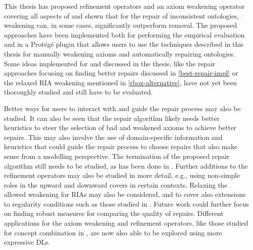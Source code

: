 
This thesis has proposed refinement operators and an axiom weakening operator covering all aspects of \SROIQ and shown that for the repair of inconsistent ontologies, weakening can, in some cases, significantly outperform removal. The proposed approaches have been implemented both for performing the empirical evaluation and in a Protégé plugin that allows users to use the techniques described in this thesis for manually weakening axioms and automatically repairing ontologies. Some ideas implemented for and discussed in the thesis, like the repair approaches focusing on finding better repairs discussed in \cref{best-repair-impl} or the relaxed RIA weakening mentioned in \cref{rbox-alternative}, have not yet been thoroughly studied and still have to be evaluated.

Better ways for users to interact with and guide the repair process may also be studied. It can also be seen that the repair algorithm likely needs better heuristics to steer the selection of bad and weakened axioms to achieve better repairs. This may also involve the use of domain-specific information and heuristics that could guide the repair process to choose repairs that also make sense from a modelling perspective. The termination of the proposed repair algorithm still needs to be studied, as has been done in \cite{confalonieri2020towards}. Further additions to the refinement operators may also be studied in more detail, e.g., using non-simple roles in the upward and downward covers in certain contexts. Relaxing the allowed weakening for RIAs may also be considered, and to cover also extensions to regularity conditions such as those studied in \cite{DBLP:conf/cade/Kazakov10}. Future work could further focus on finding robust measures for comparing the quality of repairs. Different applications for the axiom weakening and refinement operators, like those studied for concept combination in \cite{righetti2022asymmetric}, are now also able to be explored using more expressive DLs.

